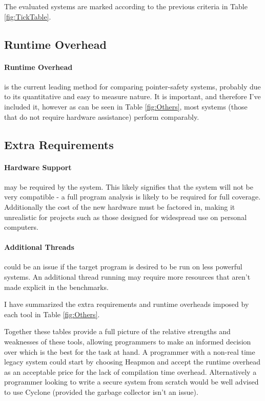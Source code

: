 The evaluated systems are marked according to the previous criteria in Table \ref{fig:TickTable}.

\subsection{Runtime Overhead}

\paragraph{Runtime Overhead} is the current leading method for comparing pointer-safety systems, probably due to its quantitative and easy to measure nature.
It is important, and therefore I've included it, however as can be seen in Table \ref{fig:Others}, most systems (those that do not require hardware assistance) perform comparably.

\subsection{Extra Requirements}

\paragraph{Hardware Support} may be required by the system.
This likely signifies that the system will not be very compatible - a full program analysis is likely to be required for full coverage.
Additionally the cost of the new hardware must be factored in, making it unrealistic for projects such as those designed for widespread use on personal computers.

\paragraph{Additional Threads} could be an issue if the target program is desired to be run on less powerful systems.
An additional thread running may require more resources that aren't made explicit in the benchmarks.

I have summarized the extra requirements and runtime overheads imposed by each tool in Table \ref{fig:Others}.

Together these tables provide a full picture of the relative strengths and weaknesses of these tools, allowing programmers to make an informed decision over which is the best for the task at hand.
A programmer with a non-real time legacy system could start by choosing Heapmon and accept the runtime overhead as an acceptable price for the lack of compilation time overhead.
Alternatively a programmer looking to write a secure system from scratch would be well advised to use Cyclone (provided the garbage collector isn't an issue).

